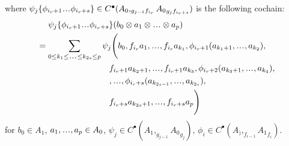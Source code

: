 where $\psi_j\{\phi_{i_r+1}\smdots \phi_{i_r+s}\}
\in C^\bullet(A_0, _{g_{j-1}f_{i_r}} {A_0}_{g_jf_{i_r+s}})$ 
is the following cochain: 
\begin{align*}
&\phantom{{}={}}
\psi_j\{\phi_{i_r+1}\smdots \phi_{i_r+s}\}
  (b_0 \otimes a_1 \otimes \smdots \otimes a_p)\\
&= 
\sum \limits_{
  0 \leq k_1 \leq \smdots \leq k_{2s} \leq p}
\psi_j \Bigg( b_0, f_{i_r}a_1, \smdots, f_{i_r}a_{k_1},
  \phi_{i_r+1}(a_{k_1+1}, \smdots, a_{k_2}),\\
&\phantom{{}moveovermoveover{}}  
  f_{i_r+1}a_{k_2+1}, \smdots, f_{i_r+1}a_{k_3},
  \phi_{i_r+2}(a_{k_3+1}, \smdots, a_{k_4}), \\
&\phantom{{}moveovermoveover{}}   
  ,\smdots, 
  \phi_{i_r+s}(a_{k_{2s-1}}, \smdots, a_{k_{2s}}), \\
&\phantom{{}moveovermoveover{}} 
  f_{i_r+s}a_{k_{2s}+1}, \smdots, f_{i_r+s}a_p \Bigg)
\end{align*}
for $b_0 \in A_1$, $a_1,\smdots,a_p \in A_0$, 
$\psi_j \in C^\bullet(A_1, _{g_{j-1}}{A_0}_{g_j})$, 
$\phi_i \in C^\bullet(A_), _{f_{i-1}}{A_1}_{f_i})$.


